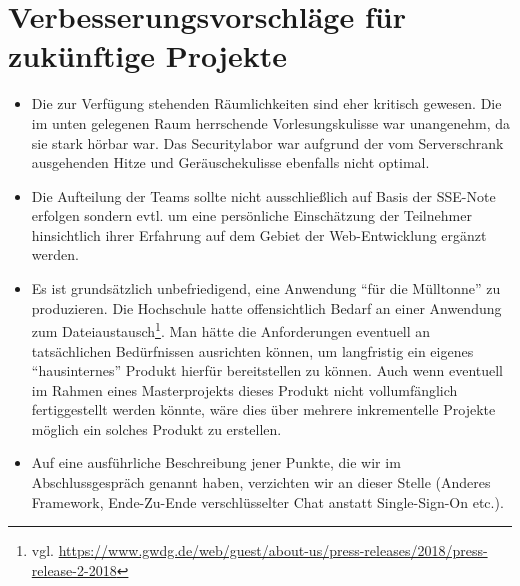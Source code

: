 \documentclass[12pt,DIV14,BCOR10mm,a4paper,parskip=half-,headsepline,headinclude,english,ngerman,bibliography=totocnumbered]{scrreprt}
\begin{document}
\chapter{Verbesserungsvorschläge für zukünftige Projekte}

\begin{itemize}
  \item Die zur Verfügung stehenden Räumlichkeiten sind eher kritisch gewesen. Die im unten gelegenen Raum herrschende Vorlesungskulisse war unangenehm, da sie stark hörbar war. Das Securitylabor war aufgrund der vom Serverschrank ausgehenden Hitze und Geräuschekulisse ebenfalls nicht optimal.
  \item Die Aufteilung der Teams sollte nicht ausschließlich auf Basis der SSE-Note erfolgen sondern evtl. um eine persönliche Einschätzung der Teilnehmer hinsichtlich ihrer Erfahrung auf dem Gebiet der Web-Entwicklung ergänzt werden.
  \item Es ist grundsätzlich unbefriedigend, eine Anwendung \enquote{für die Mülltonne} zu produzieren. Die Hochschule hatte offensichtlich Bedarf an einer Anwendung zum Dateiaustausch\footnote{vgl. \url{https://www.gwdg.de/web/guest/about-us/press-releases/2018/press-release-2-2018}}. Man hätte die Anforderungen eventuell an tatsächlichen Bedürfnissen ausrichten können, um langfristig ein eigenes \enquote{hausinternes} Produkt hierfür bereitstellen zu können. Auch wenn eventuell im Rahmen eines Masterprojekts dieses Produkt nicht vollumfänglich fertiggestellt werden könnte, wäre dies über mehrere inkrementelle Projekte möglich ein solches Produkt zu erstellen.
  \item Auf eine ausführliche Beschreibung jener Punkte, die wir im Abschlussgespräch genannt haben, verzichten wir an dieser Stelle (Anderes Framework, Ende-Zu-Ende verschlüsselter Chat anstatt Single-Sign-On etc.).
  \end{itemize}

\printbibliography

\printacronyms[title=Abkürzungsverzeichnis,toctitle=Abkürzungsverzeichnis]
\printglossary[title=Glossar,toctitle=Glossar,type=main]

\iftotalfigures
  \listoffigures
\fi


\begin{appendices}

\end{appendices}
\end{document}
